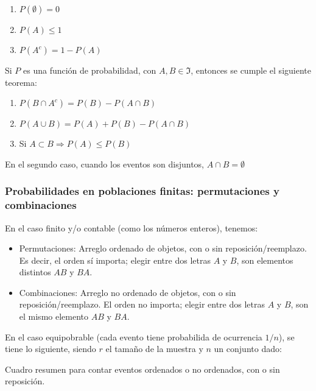 \documentclass[]{article}
\providecommand{\tightlist}{%
  \setlength{\itemsep}{0pt}\setlength{\parskip}{0pt}}
\begin{document}
\begin{enumerate}
\def\labelenumi{\arabic{enumi}.}
\tightlist
\item
  \(P(\emptyset) = 0\)
\item
  \(P(A) \leq 1\)
\item
  \(P(A^c) = 1- P(A)\)
\end{enumerate}

Si \(P\) es una función de probabilidad, con \(A,B \in \Im\), entonces
se cumple el siguiente teorema:

\begin{enumerate}
\def\labelenumi{\arabic{enumi}.}
\tightlist
\item
  \(P(B \cap A^c) = P(B) - P(A \cap B)\)
\item
  \(P(A \cup B) = P(A) + P(B) - P(A \cap B)\)
\item
  Si \(A \subset B \Rightarrow P(A) \leq P(B)\)
\end{enumerate}

En el segundo caso, cuando los eventos son disjuntos,
\(A \cap B = \emptyset\)

\subsubsection{Probabilidades en poblaciones finitas: permutaciones y
combinaciones}\label{probabilidades-en-poblaciones-finitas-permutaciones-y-combinaciones}

En el caso finito y/o contable (como los números enteros), tenemos:

\begin{itemize}
\tightlist
\item
  Permutaciones: Arreglo ordenado de objetos, con o sin
  reposición/reemplazo. Es decir, el orden sí importa; elegir entre dos
  letras \(A\) y \(B\), son elementos distintos \(AB\) y \(BA\).
\item
  Combinaciones: Arreglo no ordenado de objetos, con o sin
  reposición/reemplazo. El orden no importa; elegir entre dos letras
  \(A\) y \(B\), son el mismo elemento \(AB\) y \(BA\).
\end{itemize}

En el caso equipobrable (cada evento tiene probabilida de ocurrencia
\(1/n\)), se tiene lo siguiente, siendo \(r\) el tamaño de la muestra y
\(n\) un conjunto dado:

\label{tab:permutaciones-combinaciones-equi-2}Cuadro resumen para contar
eventos ordenados o no ordenados, con o sin reposición.
\end{document}
